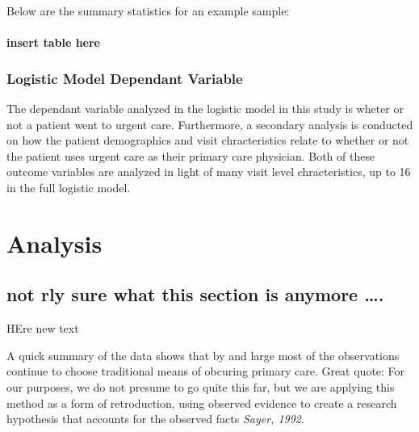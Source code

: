 \documentclass[12pt,twoside]{reedthesis}
\begin{document}
  Below are the summary statistics for an example sample:
  
  \begin{Shaded}
  \begin{Highlighting}[]
  \end{Highlighting}
  \end{Shaded}
  
  \subsubsection{insert table here}\label{insert-table-here}
  
  \subsection{Logistic Model Dependant
  Variable}\label{logistic-model-dependant-variable}
  
  \onehalfspacing
  The dependant variable analyzed in the logistic model in this study is
  wheter or not a patient went to urgent care. Furthermore, a secondary
  analysis is conducted on how the patient demographics and visit
  chracteristics relate to whether or not the patient uses urgent care as
  their primary care physician. Both of these outcome variables are
  analyzed in light of many visit level chracteristics, up to 16 in the
  full logistic model.
  
  \chapter{Analysis}\label{analysis}
  
  \onehalfspacing
  
  \section{not rly sure what this section is anymore
  \ldots{}.}\label{not-rly-sure-what-this-section-is-anymore-.}
  
  HEre new text
  
  A quick summary of the data shows that by and large most of the
  observations continue to choose traditional means of obcuring primary
  care. Great quote: For our purposes, we do not presume to go quite this
  far, but we are applying this method as a form of retroduction, using
  observed evidence to create a research hypothesis that accounts for the
  observed facts \emph{Sayer, 1992}.
  
\end{document}
